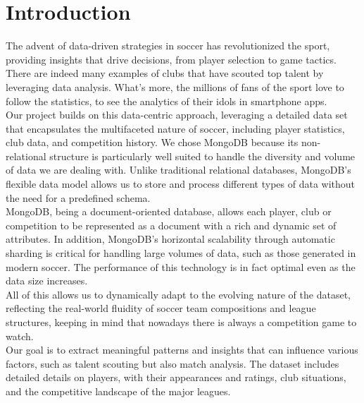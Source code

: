 \documentclass{Configuration_Files/PoliMi3i_thesis}
\begin{document}
\mainmatter %

\chapter{Introduction}
\label{ch:chapter_one}%

The advent of data-driven strategies in soccer has revolutionized the sport, providing insights that drive decisions, from player selection to game tactics. There are indeed many examples of clubs that have scouted top talent by leveraging data analysis. What's more, the millions of fans of the sport love to follow the statistics, to see the analytics of their idols in smartphone apps.\\
Our project builds on this data-centric approach, leveraging a detailed data set that encapsulates the multifaceted nature of soccer, including player statistics, club data, and competition history. We chose MongoDB because its non-relational structure is particularly well suited to handle the diversity and volume of data we are dealing with. Unlike traditional relational databases, MongoDB's flexible data model allows us to store and process different types of data without the need for a predefined schema.\\
MongoDB, being a document-oriented database, allows each player, club or competition to be represented as a document with a rich and dynamic set of attributes. In addition, MongoDB's horizontal scalability through automatic sharding is critical for handling large volumes of data, such as those generated in modern soccer. The performance of this technology is in fact optimal even as the data size increases. \\
All of this allows us to dynamically adapt to the evolving nature of the dataset, reflecting the real-world fluidity of soccer team compositions and league structures, keeping in mind that nowadays there is always a competition game to watch.\\
Our goal is to extract meaningful patterns and insights that can influence various factors, such as talent scouting but also match analysis. The dataset includes detailed details on players, with their appearances and ratings, club situations, and the competitive landscape of the major leagues.
\end{document}

